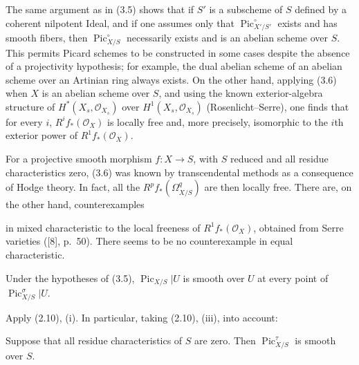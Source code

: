  The same argument as in (3.5) shows that if $S'$ is a
subscheme of $S$ defined by a coherent nilpotent Ideal, and if one assumes only
that $\operatorname{Pic}_{X'/S'}^\circ$ exists and has smooth fibers, then
$\operatorname{Pic}_{X/S}^\circ$ necessarily exists and is an abelian scheme
over $S$. This permits Picard schemes to be constructed in some cases despite
the absence of a projectivity hypothesis; for example, the dual abelian scheme
of an abelian scheme over an Artinian ring always exists. On the other hand,
applying (3.6) when $X$ is an abelian scheme over $S$, and using the known
exterior-algebra structure of $H^*(X_s,\mathcal O_{X_s})$ over
$H^1(X_s,\mathcal O_{X_s})$ (Rosenlicht--Serre), one finds that for every $i$,
$R^if_*(\mathcal O_X)$ is locally free and, more precisely, isomorphic to the
$i$th exterior power of $R^1f_*(\mathcal O_X)$.

 For a projective smooth morphism
$f:X\longrightarrow S$, with $S$ reduced and all residue characteristics zero,
(3.6) was known by transcendental methods as a consequence of Hodge theory. In
fact, all the $R^pf_*(\Omega^q_{X/S})$ are then locally free. There are, on the
other hand, counterexamples

in mixed characteristic to the local freeness of $R^1f_*(\mathcal O_X)$,
obtained from Serre varieties ([8], p.~50). There seems to be no counterexample
in equal characteristic.

 Under the hypotheses of (3.5),
$\operatorname{Pic}_{X/S}|U$ is smooth over $U$ at every point of
$\operatorname{Pic}_{X/S}^\sigma|U$.

Apply (2.10), (i). In particular, taking (2.10), (iii), into account:

 Suppose that all residue characteristics of $S$ are
zero. Then $\operatorname{Pic}_{X/S}^\tau$ is smooth over $S$.

